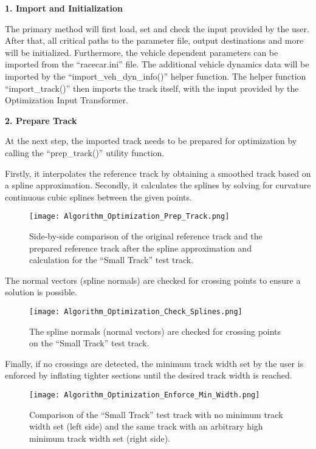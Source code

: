 \textbf{1. Import and Initialization}

The primary method will first load, set and check the input provided by the user. After that, all critical paths to the parameter file, output destinations and more will be initialized. Furthermore, the vehicle dependent parameters can be imported from the ``racecar.ini'' file. The additional vehicle dynamics data will be imported by the ``import\_veh\_dyn\_info()'' helper function. The helper function ``import\_track()'' then imports the track itself, with the input provided by the Optimization Input Transformer.

\textbf{2. Prepare Track}

At the next step, the imported track needs to be prepared for optimization by calling the ``prep\_track()'' utility function.

Firstly, it interpolates the reference track by obtaining a smoothed track based on a spline approximation. Secondly, it calculates the splines by solving for curvature continuous cubic splines between the given points.
\begin{figure}[H]
    \centering
    \texttt{[image: Algorithm\_Optimization\_Prep\_Track.png]}
    \caption{Side-by-side comparison of the original reference track and the prepared reference track after the spline approximation and calculation for the ``Small Track'' test track.}
    \label{fig:Optimization Algorithm Prepare Track}
\end{figure}
The normal vectors (spline normals) are checked for crossing points to ensure a solution is possible.
\begin{figure}[H]
    \centering
    \texttt{[image: Algorithm\_Optimization\_Check\_Splines.png]}
    \caption{The spline normals (normal vectors) are checked for crossing points on the ``Small Track'' test track.}
    \label{fig:Optimization Algorithm Check Spline Normals for Crossing Points}
\end{figure}
Finally, if no crossings are detected, the minimum track width set by the user is enforced by inflating tighter sections until the desired track width is reached.
\begin{figure}[H]
    \centering
    \texttt{[image: Algorithm\_Optimization\_Enforce\_Min\_Width.png]}
    \caption{Comparison of the ``Small Track'' test track with no minimum track width set (left side) and the same track with an arbitrary high minimum track width set (right side).}
    \label{fig:Optimization Algorithm Enforce minimum width}
\end{figure}

